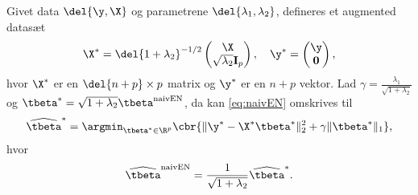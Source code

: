 \begin{lem} \label{lem:elastisk_net}
Givet data \(\del{\y, \X}\) og parametrene \(\del{\lambda_1, \lambda_2}\), defineres et augmented datasæt 
\begin{align*}
\X^* = \del{1 + \lambda_2}^{-1/2} \begin{pmatrix}
\X \\ \sqrt{\lambda_2} \mathbf{I}_p
\end{pmatrix}, \quad \y^* = \begin{pmatrix}
\y \\ \mathbf{0}
\end{pmatrix},
\end{align*}
hvor \(\X^*\) er en \(\del{n+p} \times p\) matrix og \(\y^*\) er en \(n + p\) vektor. 
Lad \(\gamma = \frac{\lambda_1}{\sqrt{1+\lambda_2}}\) og \(\tbeta^* = \sqrt{1+\lambda_2} \tbeta^\text{naivEN}\), da kan \eqref{eq:naivEN} omskrives til
\begin{align}
\widehat{\tbeta}^* = \argmin_{\tbeta^* \in \R^p} \cbr{ \Vert \y^* - \X^* \tbeta^* \Vert_2^2 +\gamma \Vert \tbeta^* \Vert_1}, \label{eq:EN11}
\end{align}
hvor
\begin{align*}
\widehat{\tbeta}^\text{naivEN} = \frac{1}{\sqrt{1+\lambda_2}} \widehat{\tbeta}^*.
\end{align*}
\end{lem}
%
